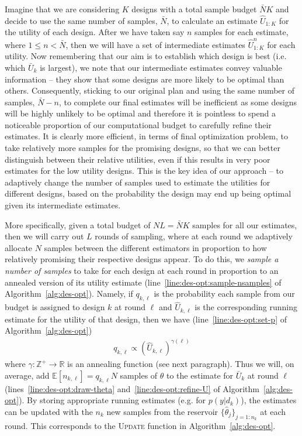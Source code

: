 Imagine that we are considering $K$ designs with a total sample budget $\bar{N}K$
and decide to use the same number of samples, $\bar{N}$, to calculate an estimate $\hat{U}_{1:K}$ for the 
utility of each design.  
After we have taken say $n$ samples
for each estimate, where $1\le n<\bar{N}$, then we will have a set of intermediate estimates $\hat{U}_{1:K}^n$ for
each utility.  Now remembering that our aim is to establish which design is best (i.e. which $\bar{U}_k$ is largest),
we note that our intermediate estimates convey valuable information -- they show that some designs are more
likely to be optimal than others.
Consequently, sticking to our original plan and using the same number of samples, $\bar{N}-n$, 
to complete our final estimates will
be inefficient as some designs will be highly unlikely to be optimal and therefore it is pointless to
spend a noticeable proportion of our computational budget to carefully refine their estimates.  It is clearly 
more efficient, in terms
of final optimization problem, to take relatively more samples for the promising designs, so that we can better 
distinguish between their relative utilities, even if this results in very poor estimates for the low utility
designs.  This is the key idea of our approach -- to adaptively change the number of samples used to estimate
the utilities for different designs, based on the probability the design may end up being optimal given its
intermediate estimates.

More specifically, given a total budget of $NL=\bar{N}K$ samples for all our estimates,
then we will carry out $L$ rounds of sampling, where at each round we adaptively allocate $N$ samples
between the different estimators in proportion to how relatively promising their respective designs
appear.  To do this,
we \emph{sample a number of samples} to take for each design at each round in proportion to an annealed version of
its utility estimate (line~\ref{line:des-opt:sample-nsamples} of Algorithm~\ref{alg:des-opt}).  
Namely, if $q_{k,\ell}$ is the probability each sample from our budget is assigned
to design $k$ at round $\ell$ and $\hat{U}_{k,\ell}$ is the corresponding running estimate for the utility
of that design, then we have (line~\ref{line:des-opt:set-p} of Algorithm~\ref{alg:des-opt})
\begin{align}
\label{eq:p_k}
q_{k,\ell} \propto (\hat{U}_{k,\ell})^{\gamma(\ell)}
\end{align}
where $\gamma : \mathbb{Z}^+ \rightarrow \mathbb{R}$ is an annealing function (see next paragraph).  
Thus we will, on average,
add $\mathbb{E}[n_{k,\ell}] = q_{k,\ell}N$ samples of $\theta$ to the estimate for $\bar{U}_k$ at round $\ell$
(lines~\ref{line:des-opt:draw-theta} and~\ref{line:des-opt:refine-U} of Algorithm~\ref{alg:des-opt}).
By storing appropriate running estimates (e.g. for $p(y | d_k)$), the estimates can 
be updated with the $n_k$ new samples from the reservoir
$\{\hat{\theta}_j\}_{j=1:n_k}$ at each round.  This corresponds to the \textsc{Update} function in
Algorithm~\ref{alg:des-opt}.

